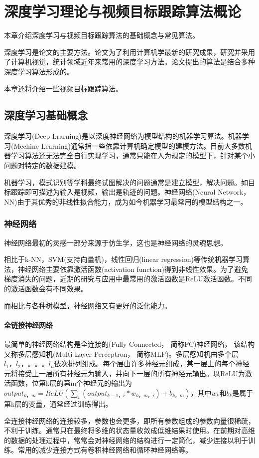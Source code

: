 
\chapter{深度学习理论与视频目标跟踪算法概论}
本章介绍深度学习与视频目标跟踪算法的基础概念与常见算法。
\par
深度学习是论文的主要方法。论文为了利用计算机学最新的研究成果，研究并采用了计算机视觉，统计领域近年来常用的深度学习方法。论文提出的算法是结合多种深度学习算法形成的。
\par
本章还将介绍一些视频目标跟踪算法。

\section{深度学习基础概念}
深度学习(Deep Lrarning)是以深度神经网络为模型结构的机器学习算法\supercite{deng2014deep}。机器学习(Mechine Learning)通常指一些依靠计算机确定模型的建模方法。目前大多数机器学习算法还无法完全自行实现学习，通常只能在人为规定的模型下，针对某个小问题对特定的数据建模。
\par
机器学习，模式识别等学科最终试图解决的问题通常是建立模型，解决问题。如目标跟踪即可描述为输入是视频，输出是轨迹的问题。神经网络(Neural Network， NN)由于其优秀的非线性拟合能力，成为如今机器学习最常用的模型结构之一。
\subsection{神经网络}
神经网络最初的灵感一部分来源于仿生学\supercite{mcculloch1943logical}\supercite{farley1954simulation}，这也是神经网络的灵魂思想。
\par
相比于k-NN，SVM(支持向量机)，线性回归(linear regression)等传统机器学习算法，神经网络主要依靠激活函数(activation function)得到非线性效果。为了避免梯度消失的问题，近期的研究与应用中最常用的激活函数是ReLU激活函数\supercite{krizhevsky2012imagenet}。不同的激活函数会有不同效果\supercite{karlik2011performance}。
\par
而相比与各种树模型，神经网络又有更好的泛化能力。
\par
\subsubsection{全链接神经网络}
\par
最简单的神经网络结构是全连接的(Fully Connected， 简称FC)神经网络， 该结构又称多层感知机(Multi Layer Perceptron， 简称MLP)。多层感知机由多个层$l_1，l_2，。。。l_n$依次排列组成。每个层由许多神经元组成，某一层上的每个神经元将接受上一层所有神经元为输入，并向下一层的所有神经元输出。以ReLU为激活函数，位第k层的第m个神经元的输出为$output_{k，m}=ReLU(\sum_{i} (output_{k-1，i}*w_{k，m，i})+b_{k，m})$，其中$w_{k}$和$b_{k}$是属于第k层的变量，通常经过训练得出。
\par
全连接神经网络的连接较多，参数也会更多，即所有参数组成的参数向量很稀疏，不利于训练。通常只在最终将多维的状态量收敛成低维结果时使用。在前期对高维的数据的处理过程中，常常会对神经网络的结构进行一定简化，减少连接以利于训练。常用的减少连接方式有卷积神经网络和循环神经网络等。
\par
